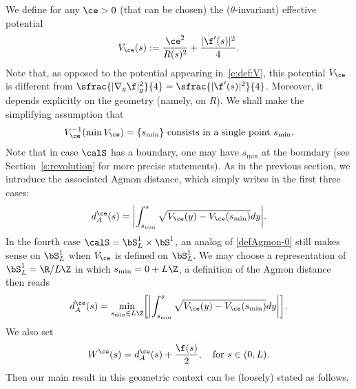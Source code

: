 We define for any $\ce>0$ (that can be chosen) the ($\theta$-invariant) effective potential
\begin{equation}
\label{e:def-Vce}
V_\ce (s) := \frac{\ce^2}{R(s)^2} + \frac{| \f'(s)|^2}{4}.
\end{equation}
Note that, as opposed to the potential appearing in~\eqref{e:def:V}, this potential $V_\ce$ is different from $\sfrac{|\nabla_g\f|_g^2}{4} = \sfrac{| \f'(s)|^2}{4}$.
Moreover, it depends explicitly on the geometry (namely, on $R$).
We shall make the simplifying assumption that
\begin{equation}
\label{s:asspt-uniq-min}
V_{\ce}^{-1}(\min V_\ce) = \{s_{\min}\} \text{ consists in a single point }s_{\min}.
\end{equation}
Note that in case $\calS$ has a boundary, one may have $s_{\min}$ at the boundary (see Section~\ref{s:revolution} for more precise statements).
As in the previous section, we introduce the associated Agmon distance, which simply writes in the first three cases:
\begin{equation}
\label{e:defbisdA}
d_{A}^{\ce}(s) = \biggl| \int_{s_{\min}}^s \sqrt{ V_\ce(y)- V_\ce(s_{\min})} dy \biggr|.
\end{equation}
In the fourth case $\calS = \bS^1_L\times \bS^1$, an analog of \eqref{defAgmon-0} still makes sense on $\bS^1_L$ when $V_{\ce}$ is defined on $\bS^1_L$. We may choose a representation of $\bS^1_L=\R/L\Z$ in which $s_{\min}= 0 + L \Z$, a definition of the Agmon distance then reads
\begin{equation}
\label{e:defbisdAT2}
d_{A}^{\ce}(s) = \min_{s_{\min}\in L \Z}\biggl[ \biggl| \int_{s_{\min}}^s \sqrt{ V_\ce(y)- V_\ce(s_{\min})} dy \biggr|\biggr].
\end{equation}
We also set
\begin{equation}
\label{e:def-Wce}
W^{\ce}(s)=d_A^{\ce}(s)+\frac{\f(s)}{2},\quad \text{for } s \in (0,L).
\end{equation}
Then our main result in this geometric context can be (loosely) stated as follows.
